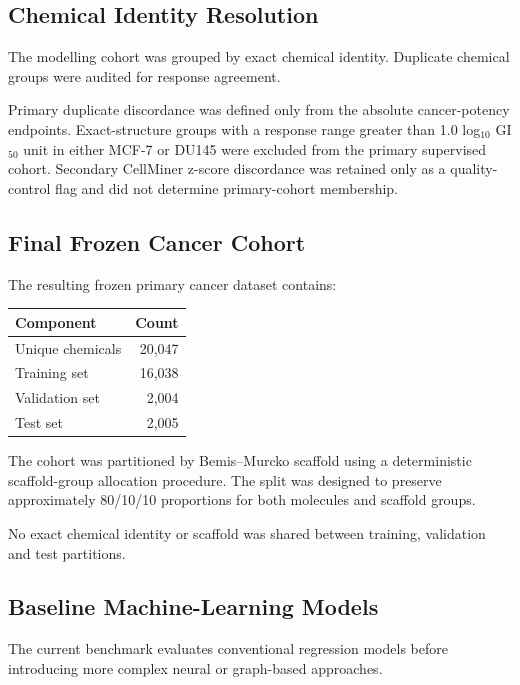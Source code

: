 \documentclass[11pt,a4paper]{article}
\begin{document}
\subsection{Chemical Identity Resolution}

The modelling cohort was grouped by exact chemical identity. Duplicate chemical groups were audited for response agreement.

Primary duplicate discordance was defined only from the absolute cancer-potency endpoints. Exact-structure groups with a response range greater than 1.0 log$_{10}$ GI$_{50}$ unit in either MCF-7 or DU145 were excluded from the primary supervised cohort. Secondary CellMiner z-score discordance was retained only as a quality-control flag and did not determine primary-cohort membership.

\subsection{Final Frozen Cancer Cohort}

The resulting frozen primary cancer dataset contains:

\begin{center}
\begin{tabular}{lr}
\toprule
\textbf{Component} & \textbf{Count} \\
\midrule
Unique chemicals & 20,047 \\
Training set & 16,038 \\
Validation set & 2,004 \\
Test set & 2,005 \\
\bottomrule
\end{tabular}
\end{center}

The cohort was partitioned by Bemis--Murcko scaffold using a deterministic scaffold-group allocation procedure. The split was designed to preserve approximately 80/10/10 proportions for both molecules and scaffold groups.

No exact chemical identity or scaffold was shared between training, validation and test partitions.

\subsection{Baseline Machine-Learning Models}

The current benchmark evaluates conventional regression models before introducing more complex neural or graph-based approaches.
\end{document}
